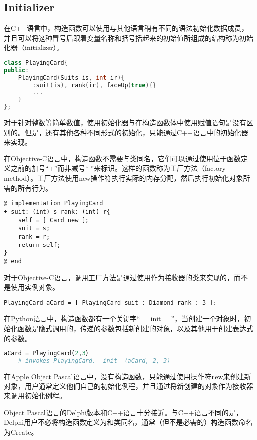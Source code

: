 \subsection{Initializer}



在C++语言中，构造函数可以使用与其他语言稍有不同的语法初始化数据成员，并且可以将这种冒号后跟着变量名称和括号括起来的初始值所组成的结构称为初始化器（initializer）。


\begin{lstlisting}[language=C++]
class PlayingCard{
public:
	PlayingCard(Suits is, int ir){
		:suit(is), rank(ir), faceUp(true){}
		...
	}
};
\end{lstlisting}

对于针对整数等简单数值，使用初始化器与在构造函数体中使用赋值语句是没有区别的。但是，还有其他各种不同形式的初始化，只能通过C++语言中的初始化器来实现。

在Objective-C语言中，构造函数不需要与类同名，它们可以通过使用位于函数定义之前的加号“+”而非减号“-”来标识。这样的函数称为工厂方法（factory method）。工厂方法使用new操作符执行实际的内存分配，然后执行初始化对象所需的所有行为。

\begin{lstlisting}[language={[Objective]C}]
@ implementation PlayingCard
+ suit: (int) s rank: (int) r{
	self = [ Card new ];
	suit = s;
	rank = r;
	return self;
} 
@ end
\end{lstlisting}

对于Objective-C语言，调用工厂方法是通过使用作为接收器的类来实现的，而不是使用实例对象。

\begin{lstlisting}[language={[Objective]C}]
PlayingCard aCard = [ PlayingCard suit : Diamond rank : 3 ];
\end{lstlisting}

在Python语言中，构造函数都有一个关键字“\_\_init\_\_”，当创建一个对象时，初始化函数是隐式调用的，传递的参数包括新创建的对象，以及其他用于创建表达式的参数。

\begin{lstlisting}[language=Python]
aCard = PlayingCard(2,3)
	# invokes PlayingCard.__init__(aCard, 2, 3)
\end{lstlisting}

在Apple Object Pascal语言中，没有构造函数，只能通过使用操作符new来创建新对象，用户通常定义他们自己的初始化例程，并且通过将新创建的对象作为接收器来调用初始化例程。

Object Pascal语言的Delphi版本和C++语言十分接近。与C++语言不同的是，Delphi用户不必将构造函数定义为和类同名，通常（但不是必需的）构造函数命名为Create。

